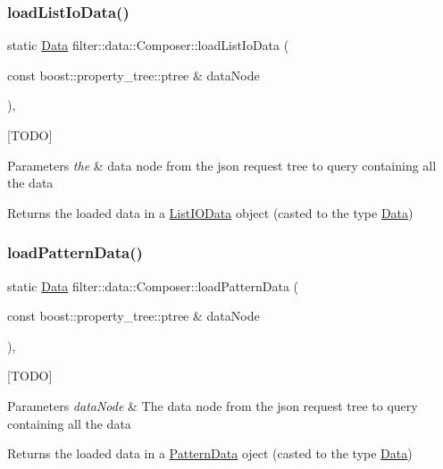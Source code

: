 \subsubsection{\texorpdfstring{load\+List\+Io\+Data()}{loadListIoData()}}
{\footnotesize\ttfamily static \hyperlink{classfilter_1_1data_1_1_data}{Data} filter\+::data\+::\+Composer\+::load\+List\+Io\+Data (\begin{DoxyParamCaption}\item[{const boost\+::property\+\_\+tree\+::ptree \&}]{data\+Node }\end{DoxyParamCaption})\hspace{0.3cm}{\ttfamily [inline]}, {\ttfamily [static]}}

\mbox{[}T\+O\+DO\mbox{]} 
\begin{DoxyParams}{Parameters}
{\em the} & data node from the json request tree to query containing all the data \\
\hline
\end{DoxyParams}
\begin{DoxyReturn}{Returns}
the loaded data in a \hyperlink{classfilter_1_1data_1_1_list_i_o_data}{List\+I\+O\+Data} object (casted to the type \hyperlink{classfilter_1_1data_1_1_data}{Data}) 
\end{DoxyReturn}
\mbox{\label{classfilter_1_1data_1_1_composer_a6dd5029c65c516d78098ddd4cd2bd389}} 
\subsubsection{\texorpdfstring{load\+Pattern\+Data()}{loadPatternData()}}
{\footnotesize\ttfamily static \hyperlink{classfilter_1_1data_1_1_data}{Data} filter\+::data\+::\+Composer\+::load\+Pattern\+Data (\begin{DoxyParamCaption}\item[{const boost\+::property\+\_\+tree\+::ptree \&}]{data\+Node }\end{DoxyParamCaption})\hspace{0.3cm}{\ttfamily [inline]}, {\ttfamily [static]}}

\mbox{[}T\+O\+DO\mbox{]} 
\begin{DoxyParams}{Parameters}
{\em data\+Node} & The data node from the json request tree to query containing all the data \\
\hline
\end{DoxyParams}
\begin{DoxyReturn}{Returns}
the loaded data in a \hyperlink{classfilter_1_1data_1_1_pattern_data}{Pattern\+Data} oject (casted to the type \hyperlink{classfilter_1_1data_1_1_data}{Data}) 
\end{DoxyReturn}
\mbox{\label{classfilter_1_1data_1_1_composer_a2ec970442fd0b77b6bd91b4a0f6ee561}} 
